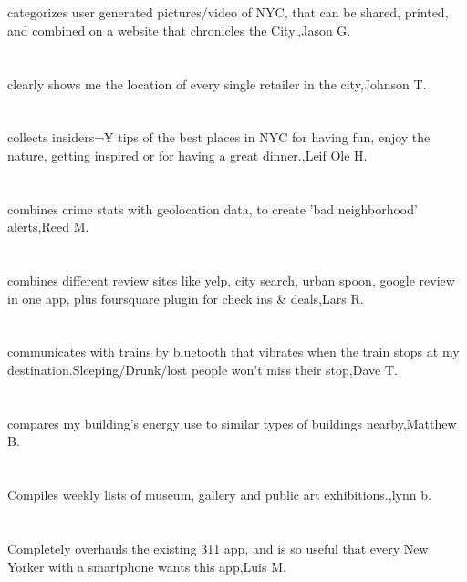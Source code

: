 \section{}categorizes user generated pictures/video of NYC, that can be shared, printed, and combined on a website that chronicles the City.,Jason G.	
\section{}clearly shows me the location of every single retailer in the city,Johnson T.	
\section{} collects insiders¬¥ tips of the best places in NYC for having fun, enjoy the nature, getting inspired or for having a great dinner.,Leif Ole H.	
\section{}combines crime stats with geolocation data, to create 'bad neighborhood' alerts,Reed M.	
\section{}combines different review sites like yelp, city search, urban spoon, google review in one app, plus foursquare plugin for check ins \& deals,Lars R.	
\section{}communicates with trains by bluetooth that vibrates when the train stops at my destination.Sleeping/Drunk/lost people won't miss their stop,Dave T.	
\section{}compares my building's energy use to similar types of buildings nearby,Matthew B.	
\section{}Compiles weekly  lists of museum, gallery and public art exhibitions.,lynn b.	
\section{} Completely overhauls the existing 311 app, and is so useful that every New Yorker with a smartphone wants this app,Luis M.	
